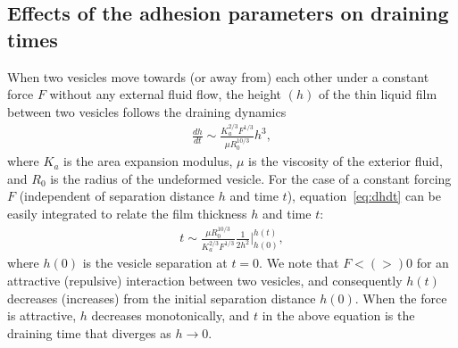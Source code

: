 \documentclass[prf,superscriptaddress,showpacs]{revtex4-1}
\begin{document}
\subsection{Effects of the adhesion parameters on draining times}
\label{subsec:qflow_draining_times}
When two vesicles move towards (or away from) each other under a
constant force $F$ without any external fluid flow, the height $(h)$ of
the thin liquid film between two vesicles follows the draining
dynamics~\cite{RamachandranLeal2010_PoF}
\begin{align}
  \label{eq:dhdt}
  \frac{d h}{dt} \sim \frac{K_a^{2/3} F^{1/3}}{\mu R_0^{10/3}} h^3,
\end{align}
where $K_a$ is the area expansion modulus, $\mu$ is the viscosity of the
exterior fluid, and $R_0$ is the radius of the undeformed vesicle.  For
the case of a constant forcing $F$ (independent of separation distance
$h$ and time $t$), equation~\eqref{eq:dhdt} can be easily integrated to
relate the film thickness $h$ and time $t$:
\begin{align*}
  t \sim \frac{\mu R_0^{10/3}}{K_a^{2/3} F^{1/3}}
    \frac{1}{2 h^2} \bigg|^{h(t)}_{h(0)},
\end{align*}
where $h(0)$ is the vesicle separation at $t=0$.  We note that $F< (>)
0$ for an attractive  (repulsive) interaction between two vesicles,  and
consequently $h(t)$ decreases (increases) from  the initial separation
distance $h(0)$.  When the force is attractive, $h$ decreases
monotonically, and $t$ in the above equation is the draining time that
diverges as $h\rightarrow 0$.
\end{document}
